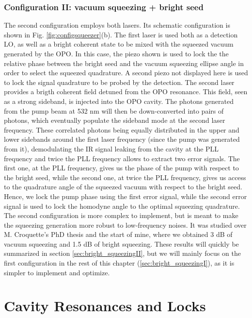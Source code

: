 \subsubsection{Configuration II: vacuum squeezing + bright seed} The second configuration employs both lasers. Its schematic configuration is shown in Fig. \ref{fig:configsqueezer}(b). The first laser is used both as a detection LO, as well as a bright coherent state to be mixed with the squeezed vacuum generated by the OPO. In this case, the piezo shown is used to lock the the relative phase between the bright seed and the vacuum squeezing ellipse angle in order to select the squeezed quadrature. A second piezo not displayed here is used to lock the signal quadrature to be probed by the detection. The second laser provides a brigth coherent field detuned from the OPO resonance. This field, seen as a strong sideband, is injected into the OPO cavity. The photons generated from the pump beam at 532 nm will then be down-converted into pairs of photons, which eventually populate the sideband mode at the second laser frequency. These correlated photons being equally distributed in the upper and lower sidebands around the first laser frequency (since the pump was generated from it), demodulating the IR signal leaking from the cavity at the PLL frequency and twice the PLL frequency allows to extract two error signals. The first one, at the PLL frequency, gives us the phase of the pump with respect to the bright seed, while the second one, at twice the PLL frequency, gives us access to the quadrature angle of the squeezed vacuum with respect to the bright seed. Hence, we lock the pump phase using the first error signal, while the second error signal is used to lock the homodyne angle to the optimal squeezing quadrature. \\ 

The second configuration is more complex to implement, but is meant to make the squeezing generation more robust to low-frequency noises. It was studied over M. Croquette's PhD thesis \cite{croquette} and the start of mine, where we obtained 3 dB of vacuum squeezing and 1.5 dB of bright squeezing. These results will quickly be summarized in section \ref{sec:bright_squeezingII}, but we will mainly focus on the first configuration in the rest of this chapter (\ref{sec:bright_squeezingI}), as it is simpler to implement and optimize. 

\section{Cavity Resonances and Locks}

